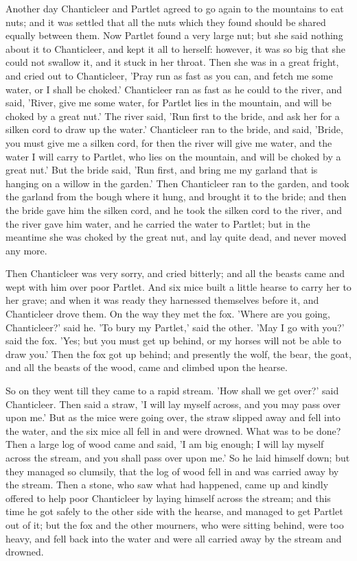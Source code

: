 \documentclass[12pt]{book}
\begin{document}
Another day Chanticleer and Partlet agreed to go again to the
mountains to eat nuts; and it was settled that all the nuts which they
found should be shared equally between them. Now Partlet found a very
large nut; but she said nothing about it to Chanticleer, and kept it
all to herself: however, it was so big that she could not swallow it,
and it stuck in her throat. Then she was in a great fright, and cried
out to Chanticleer, 'Pray run as fast as you can, and fetch me some
water, or I shall be choked.' Chanticleer ran as fast as he could to
the river, and said, 'River, give me some water, for Partlet lies in
the mountain, and will be choked by a great nut.' The river said, 'Run
first to the bride, and ask her for a silken cord to draw up the
water.' Chanticleer ran to the bride, and said, 'Bride, you must give
me a silken cord, for then the river will give me water, and the water
I will carry to Partlet, who lies on the mountain, and will be choked
by a great nut.' But the bride said, 'Run first, and bring me my
garland that is hanging on a willow in the garden.' Then Chanticleer
ran to the garden, and took the garland from the bough where it hung,
and brought it to the bride; and then the bride gave him the silken
cord, and he took the silken cord to the river, and the river gave him
water, and he carried the water to Partlet; but in the meantime she
was choked by the great nut, and lay quite dead, and never moved any
more.

Then Chanticleer was very sorry, and cried bitterly; and all the
beasts came and wept with him over poor Partlet. And six mice built a
little hearse to carry her to her grave; and when it was ready they
harnessed themselves before it, and Chanticleer drove them. On the way
they met the fox. 'Where are you going, Chanticleer?' said he. 'To
bury my Partlet,' said the other. 'May I go with you?' said the fox.
'Yes; but you must get up behind, or my horses will not be able to
draw you.' Then the fox got up behind; and presently the wolf, the
bear, the goat, and all the beasts of the wood, came and climbed upon
the hearse.

So on they went till they came to a rapid stream. 'How shall we get
over?' said Chanticleer. Then said a straw, 'I will lay myself across,
and you may pass over upon me.' But as the mice were going over, the
straw slipped away and fell into the water, and the six mice all fell
in and were drowned. What was to be done? Then a large log of wood
came and said, 'I am big enough; I will lay myself across the stream,
and you shall pass over upon me.' So he laid himself down; but they
managed so clumsily, that the log of wood fell in and was carried away
by the stream. Then a stone, who saw what had happened, came up and
kindly offered to help poor Chanticleer by laying himself across the
stream; and this time he got safely to the other side with the hearse,
and managed to get Partlet out of it; but the fox and the other
mourners, who were sitting behind, were too heavy, and fell back into
the water and were all carried away by the stream and drowned.
\end{document}
